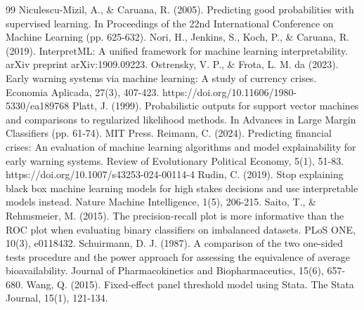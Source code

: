 \documentclass[preprint,12pt,authoryear]{elsarticle}
\begin{document}
\begin{thebibliography}{99}
 Niculescu-Mizil, A., \& Caruana, R. (2005). Predicting good probabilities with supervised learning. In Proceedings of the 22nd International Conference on Machine Learning (pp. 625-632).
 Nori, H., Jenkins, S., Koch, P., \& Caruana, R. (2019). InterpretML: A unified framework for machine learning interpretability. arXiv preprint arXiv:1909.09223.
 Ostrensky, V. P., \& Frota, L. M. da (2023). Early warning systems via machine learning: A study of currency crises. Economia Aplicada, 27(3), 407-423. https://doi.org/10.11606/1980-5330/ea189768
 Platt, J. (1999). Probabilistic outputs for support vector machines and comparisons to regularized likelihood methods. In Advances in Large Margin Classifiers (pp. 61-74). MIT Press.
 Reimann, C. (2024). Predicting financial crises: An evaluation of machine learning algorithms and model explainability for early warning systems. Review of Evolutionary Political Economy, 5(1), 51-83. https://doi.org/10.1007/s43253-024-00114-4
 Rudin, C. (2019). Stop explaining black box machine learning models for high stakes decisions and use interpretable models instead. Nature Machine Intelligence, 1(5), 206-215.
 Saito, T., \& Rehmsmeier, M. (2015). The precision-recall plot is more informative than the ROC plot when evaluating binary classifiers on imbalanced datasets. PLoS ONE, 10(3), e0118432.
 Schuirmann, D. J. (1987). A comparison of the two one-sided tests procedure and the power approach for assessing the equivalence of average bioavailability. Journal of Pharmacokinetics and Biopharmaceutics, 15(6), 657-680.
 Wang, Q. (2015). Fixed-effect panel threshold model using Stata. The Stata Journal, 15(1), 121-134.
\end{thebibliography}
\end{document}
